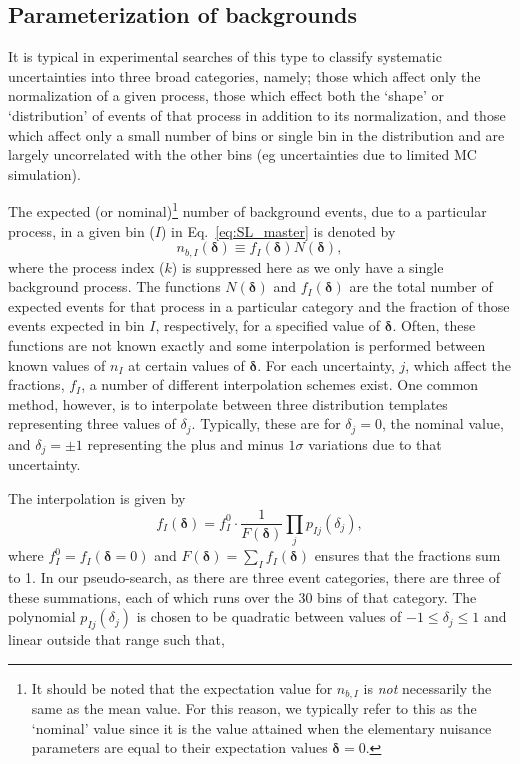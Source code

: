 \documentclass[11pt]{article}
\begin{document}
\clearpage

\subsection{Parameterization of backgrounds}

It is typical in experimental searches of this type to classify systematic uncertainties into three broad categories, namely; those which affect only the normalization of a given process, those which effect both the
`shape' or `distribution' of events of that process in addition to its normalization, and those which affect only a small number of bins or single bin in the distribution and are largely uncorrelated with the other
bins (eg uncertainties due to limited MC simulation).

The expected (or nominal)\footnote{It should be noted that the expectation value for $n_{b,I}$ is \emph{not} necessarily the same as the mean value. For this reason, we typically refer
to this as the `nominal' value since it is the value attained when the elementary nuisance parameters are equal to their expectation values $\mathbf{\delta}=0$.} number of background events, due to a particular process, in a given bin ($I$) in %
Eq.~\eqref{eq:SL_master} is denoted by
%
\begin{equation}
  n_{b,I}(\bm{\delta}) \equiv %
  f_{I}(\bm{\delta}) N(\bm{\delta}),
\end{equation}
%
where the process index ($k$) is suppressed here as we only have a single background process. The functions $N(\bm{\delta})$ and  $f_{I}(\bm{\delta})$ are the total number of expected events for that process in a particular
category and the fraction of those events expected in bin $I$, respectively, for a specified value of $\bm{\delta}$. Often, these functions are not known exactly and some interpolation is performed between known
values of $n_{I}$ at certain values of $\bm{\delta}$. For each uncertainty, $j$, which affect the fractions, $f_{I}$, a number of different interpolation schemes exist. One common method, however, is to interpolate between
three distribution templates representing three values of $\delta_{j}$. Typically, these are for $\delta_{j}=0$, the nominal value, and $\delta_{j}=\pm1$ representing the plus and minus $1\sigma$ variations due to that uncertainty.

The interpolation is given by
%
\begin{equation}
 f_{I}(\bm{\delta}) = f_{I}^{0}\cdot\frac{1}{F(\bm{\delta})} \prod_{j} p_{Ij}(\delta_{j}),
 \label{eqn:frac_function}
\end{equation}
%
where $f_{I}^{0}=f_{I}(\bm{\delta}=0)$ and $F(\bm{\delta})=\sum_{I}f_{I}(\bm{\delta})$ ensures that the fractions sum to 1. In our pseudo-search, as there are three event categories,
there are three of these summations, each of which runs over the 30 bins of that category. The polynomial $p_{Ij}(\delta_{j})$ is chosen to be quadratic between values of $-1 \leq \delta_{j} \leq 1$
and linear outside that range such that,
\end{document}
